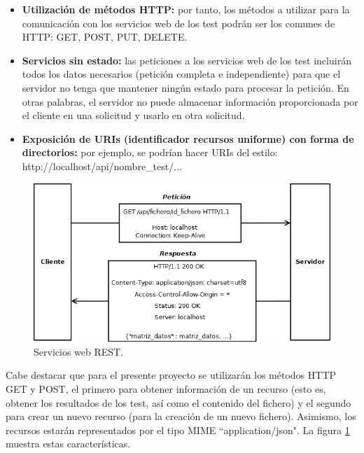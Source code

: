 \begin{itemize}
\item \textbf{Utilización de métodos HTTP:} por tanto, los métodos a utilizar para la comunicación con los servicios web de los test podrán ser los comunes de HTTP: GET, POST, PUT, DELETE.
\item \textbf{Servicios sin estado:} las peticiones a los servicios web de los test incluirán todos los datos necesarios (petición completa e independiente) para que el servidor no tenga que mantener ningún estado para procesar la petición. En otras palabras, el servidor no puede almacenar información proporcionada por el cliente en una solicitud y usarlo en otra solicitud.
\item \textbf{Exposición de URIs (identificador recursos uniforme) con forma de directorios:} por ejemplo, se podrían hacer URIs del estilo: http://localhost/api/nombre\_test/...
\end{itemize}

\begin{figure}[H]
\centering
\includegraphics[width=12cm,height=6cm]{figuras/rest.png}
\caption{Servicios web REST.}
\label{fig:rest}
\end{figure}

Cabe destacar que para el presente proyecto se utilizarán los métodos HTTP GET y POST, el primero para obtener información de un recurso (esto es, obtener los resultados de los test, así como el contenido del fichero) y el segundo para crear un nuevo recurso (para la creación de un nuevo fichero). Asimismo, los recursos estarán representados por el tipo MIME ``application/json". La figura \ref{fig:rest} muestra estas características.

